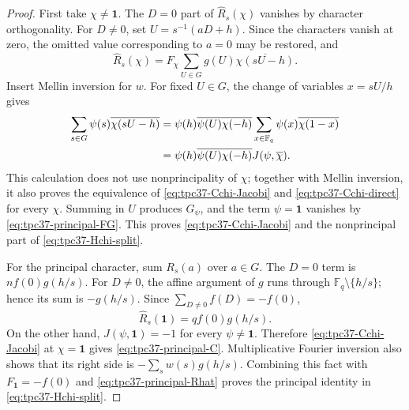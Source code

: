 \begin{proof}
First take \(\chi\ne\mathbf1\).  The \(D=0\) part of
\(\widehat R_s(\chi)\) vanishes by character orthogonality.  For
\(D\ne0\), set
\(U=s^{-1}(aD+h)\).  Since the characters vanish at zero, the omitted
value corresponding to \(a=0\) may be restored, and
\begin{equation}
 \widehat R_s(\chi)
 =F_\chi\sum_{U\in G}g(U)
 \overline{\chi(sU-h)}.
 \label{eq:tpc37-Rhat-nonprincipal-factor}
\end{equation}
Insert Mellin inversion for \(w\).  For fixed \(U\in G\), the change of
variables \(x=sU/h\) gives
\begin{align}
 \sum_{s\in G}\psi(s)\overline{\chi(sU-h)}
 &={\psi(h)}\overline{\psi(U)}
   \overline{\chi(-h)}
   \sum_{x\in\mathbb F_q}
   \psi(x)\overline{\chi(1-x)}
 \notag\\
 &=\psi(h)\overline{\psi(U)}
   \overline{\chi(-h)}J(\psi,\overline\chi).
 \label{eq:tpc37-fixed-U-Jacobi}
\end{align}
This calculation does not use nonprincipality of \(\chi\); together
with Mellin inversion, it also proves the equivalence of
\eqref{eq:tpc37-Cchi-Jacobi} and \eqref{eq:tpc37-Cchi-direct} for every
\(\chi\).
Summing in \(U\) produces \(G_\psi\), and the term
\(\psi=\mathbf1\) vanishes by \eqref{eq:tpc37-principal-FG}.  This proves
\eqref{eq:tpc37-Cchi-Jacobi} and the nonprincipal part of
\eqref{eq:tpc37-Hchi-split}.

For the principal character, sum \(R_s(a)\) over \(a\in G\).  The
\(D=0\) term is \(nf(0)g(h/s)\).  For \(D\ne0\), the affine argument
of \(g\) runs through \(\mathbb F_q\setminus\{h/s\}\); hence its sum is
\(-g(h/s)\).  Since \(\sum_{D\ne0}f(D)=-f(0)\),
\begin{equation}
 \widehat R_s(\mathbf1)=qf(0)g(h/s).
 \label{eq:tpc37-principal-Rhat}
\end{equation}
On the other hand,
\(J(\psi,\mathbf1)=-1\) for every
\(\psi\ne\mathbf1\).  Therefore
\eqref{eq:tpc37-Cchi-Jacobi} at \(\chi=\mathbf1\) gives
\eqref{eq:tpc37-principal-C}.  Multiplicative Fourier inversion also
shows that its right side is
\(-\sum_s w(s)g(h/s)\).  Combining this fact with
\(F_{\mathbf1}=-f(0)\) and \eqref{eq:tpc37-principal-Rhat} proves the
principal identity in \eqref{eq:tpc37-Hchi-split}.
\end{proof}

